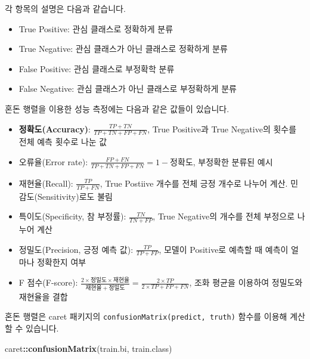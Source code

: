 \documentclass[12pt,]{book}
\newenvironment{Shaded}{\begin{snugshade}}{\end{snugshade}}
\newcommand{\KeywordTok}[1]{\textcolor[rgb]{0.13,0.29,0.53}{\textbf{#1}}}
\newcommand{\NormalTok}[1]{#1}
\newcommand{\OperatorTok}[1]{\textcolor[rgb]{0.81,0.36,0.00}{\textbf{#1}}}
\providecommand{\tightlist}{%
  \setlength{\itemsep}{0pt}\setlength{\parskip}{0pt}}
\begin{document}
각 항목의 설명은 다음과 같습니다.

\begin{itemize}
\tightlist
\item
  True Positive: 관심 클래스로 정확하게 분류
\item
  True Negative: 관심 클래스가 아닌 클래스로 정확하게 분류
\item
  False Positive: 관심 클래스로 부정확학 분류
\item
  False Negative: 관심 클래스가 아닌 클래스로 부정확하게 분류
\end{itemize}

혼돈 행렬을 이용한 성능 측정에는 다음과 같은 값들이 있습니다.

\begin{itemize}
\item
  \textbf{정확도(Accuracy)}: \(\frac{TP + TN}{TP + TN + FP + FN}\), True Positive과 True Negative의 횟수를 전체 예측 횟수로 나눈 값
\item
  오류율(Error rate): \(\frac{FP + FN}{TP + TN + FP + FN} = 1 - 정확도\), 부정확한 분류된 예시
\item
  재현율(Recall): \(\frac{TP}{TP + FN}\), True Postiive 개수를 전체 긍정 개수로 나누어 계산. 민감도(Sensitivity)로도 불림
\item
  특이도(Specificity, 참 부정률): \(\frac{TN}{TN + FP}\), True Negative의 개수를 전체 부정으로 나누어 계산
\item
  정밀도(Precision, 긍정 예측 값): \(\frac{TP}{TP + FP}\), 모델이 Positive로 예측할 때 예측이 얼마나 정확한지 여부
\item
  F 점수(F-score): \(\frac{2 \times 정밀도 \times 재현율}{재현율 + 정밀도} = \frac{2 \times TP}{2 \times TP + FP+ FN}\), 조화 평균을 이용하여 정밀도와 재현율을 결합
\end{itemize}

혼돈 행렬은 caret 패키지의 \texttt{confusionMatrix(predict,\ truth)} 함수를 이용해 계산할 수 있습니다.

\begin{Shaded}
\begin{Highlighting}[]
\NormalTok{caret}\OperatorTok{::}\KeywordTok{confusionMatrix}\NormalTok{(train.bi, train.class)}
\end{Highlighting}
\end{Shaded}
\end{document}
